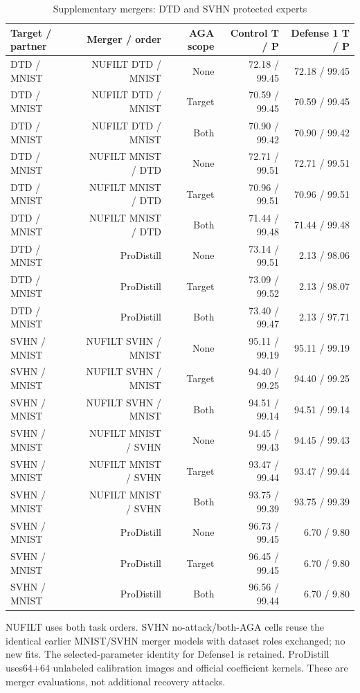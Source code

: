 \begin{table}[!htbp]
\centering
\small
\caption{Supplementary mergers: DTD and SVHN protected experts}
\label{tab:other_tasks}
\begin{tabular}{lrrrr}
\toprule
Target / partner & Merger / order & AGA scope & Control T / P & Defense 1 T / P \\
\midrule
DTD / MNIST & NUFILT DTD / MNIST & None & 72.18 / 99.45 & 72.18 / 99.45 \\
DTD / MNIST & NUFILT DTD / MNIST & Target & 70.59 / 99.45 & 70.59 / 99.45 \\
DTD / MNIST & NUFILT DTD / MNIST & Both & 70.90 / 99.42 & 70.90 / 99.42 \\
DTD / MNIST & NUFILT MNIST / DTD & None & 72.71 / 99.51 & 72.71 / 99.51 \\
DTD / MNIST & NUFILT MNIST / DTD & Target & 70.96 / 99.51 & 70.96 / 99.51 \\
DTD / MNIST & NUFILT MNIST / DTD & Both & 71.44 / 99.48 & 71.44 / 99.48 \\
DTD / MNIST & ProDistill & None & 73.14 / 99.51 & 2.13 / 98.06 \\
DTD / MNIST & ProDistill & Target & 73.09 / 99.52 & 2.13 / 98.07 \\
DTD / MNIST & ProDistill & Both & 73.40 / 99.47 & 2.13 / 97.71 \\
SVHN / MNIST & NUFILT SVHN / MNIST & None & 95.11 / 99.19 & 95.11 / 99.19 \\
SVHN / MNIST & NUFILT SVHN / MNIST & Target & 94.40 / 99.25 & 94.40 / 99.25 \\
SVHN / MNIST & NUFILT SVHN / MNIST & Both & 94.51 / 99.14 & 94.51 / 99.14 \\
SVHN / MNIST & NUFILT MNIST / SVHN & None & 94.45 / 99.43 & 94.45 / 99.43 \\
SVHN / MNIST & NUFILT MNIST / SVHN & Target & 93.47 / 99.44 & 93.47 / 99.44 \\
SVHN / MNIST & NUFILT MNIST / SVHN & Both & 93.75 / 99.39 & 93.75 / 99.39 \\
SVHN / MNIST & ProDistill & None & 96.73 / 99.45 & 6.70 / 9.80 \\
SVHN / MNIST & ProDistill & Target & 96.45 / 99.45 & 6.70 / 9.80 \\
SVHN / MNIST & ProDistill & Both & 96.56 / 99.44 & 6.70 / 9.80 \\
\bottomrule
\end{tabular}
\par\vspace{3pt}\begin{minipage}{0.98\linewidth}\footnotesize NUFILT uses both task orders. SVHN no-attack/both-AGA cells reuse the identical earlier MNIST/SVHN merger models with dataset roles exchanged; no new fits. The selected-parameter identity for Defense1 is retained. ProDistill uses64+64 unlabeled calibration images and official coefficient kernels. These are merger evaluations, not additional recovery attacks.\end{minipage}
\end{table}


